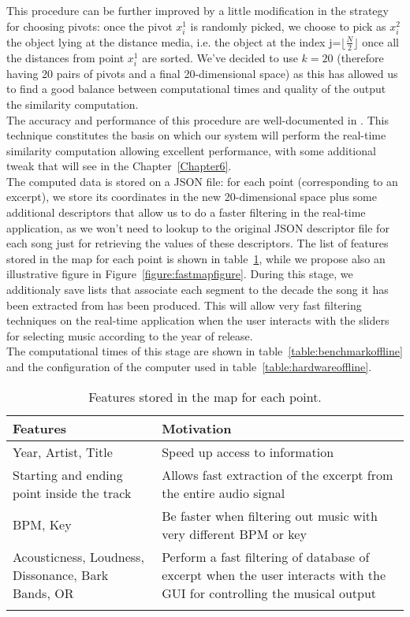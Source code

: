This procedure can be further improved by a little modification in the strategy for choosing pivots: once the pivot $x_i^1$ is randomly picked, we choose to pick as $x_i^2$ the object lying at the distance media, i.e. the object at the index j=$ \lfloor \frac{N}{2} \rfloor$ once all the distances from point $x_i^1$ are sorted. We've decided to use $k=20$ (therefore having 20 pairs of pivots and a final 20-dimensional space) as this has allowed us to find a good balance between computational times and quality of the output the similarity computation.\\
The accuracy and performance of this procedure are well-documented in \cite{fastmap12}. This technique constitutes the basis on which our system will perform the real-time similarity computation allowing excellent performance, with some additional tweak that will see in the Chapter~\ref{Chapter6}. \\
The computed data is stored on a JSON file: for each point (corresponding to an excerpt), we store its coordinates in the new 20-dimensional space plus some additional descriptors that allow us to do a faster filtering in the real-time application, as we won't need to lookup to the original JSON descriptor file for each song just for retrieving the values of these descriptors. The list of features stored in the map for each point is shown in table~\ref{table:fastmap}, while we propose also an illustrative figure in Figure~\ref{figure:fastmapfigure}. During this stage, we additionaly save lists that associate each segment to the decade the song it has been extracted from has been produced. This will allow very fast filtering techniques on the real-time application when the user interacts with the sliders for selecting music according to the year of release. \\The computational times of this stage are shown in table~\ref{table:benchmarkoffline} and the configuration of the computer used in table~\ref{table:hardwareoffline}.


\begin{center}
\begin{longtable}{ p{}  p{} } 
\textbf{Features} &  \textbf{Motivation} \\ \toprule
Year, Artist, Title & Speed up access to information\\ \midrule
Starting and ending point inside the track & Allows fast extraction of the excerpt from the entire audio signal \\ \midrule
BPM, Key & Be faster when filtering out music with very different BPM or key\\ \midrule
Acousticness, Loudness, Dissonance, Bark Bands, OR & Perform a fast filtering of database of excerpt when the user interacts with the GUI for controlling the musical output\\ \bottomrule
\caption[Features stored in the map]{Features stored in the map for each point.}
\label{table:fastmap}
\end{longtable}
\end{center}

